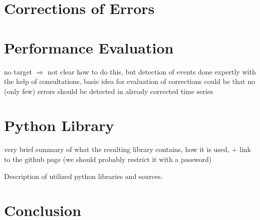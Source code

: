 \documentclass[12pt,a4paper]{article}
\begin{document}
\section{Corrections of Errors}


\section{Performance Evaluation}
no target $\Rightarrow$ not clear how to do this, but detection of events done expertly with the help of consultations,  basic idea for evaluation of corrections could be that no (only few) errors should be detected in already corrected time series 


\section{Python Library}

very brief summary of what the resulting library contains, how it is used, + link to the github page (we should probably restrict it with a password)

Description of utilized python libraries and sources.






\section{Conclusion}
\end{document}
